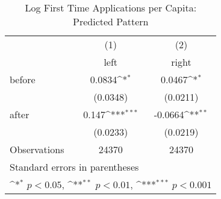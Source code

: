 \begin{table}[htbp]\centering
\def\sym#1{\ifmmode^{#1}\else\(^{#1}\)\fi}
\caption{Log First Time Applications per Capita: Predicted Pattern}
\begin{tabular}{l*{2}{c}}
\hline\hline
                    &\multicolumn{1}{c}{(1)}&\multicolumn{1}{c}{(2)}\\
                    &\multicolumn{1}{c}{left}&\multicolumn{1}{c}{right}\\
\hline
before              &      0.0834\sym{*}  &      0.0467\sym{*}  \\
                    &    (0.0348)         &    (0.0211)         \\
[1em]
after               &       0.147\sym{***}&     -0.0664\sym{**} \\
                    &    (0.0233)         &    (0.0219)         \\
\hline
Observations        &       24370         &       24370         \\
\hline\hline
\multicolumn{3}{l}{\footnotesize Standard errors in parentheses}\\
\multicolumn{3}{l}{\footnotesize \sym{*} \(p<0.05\), \sym{**} \(p<0.01\), \sym{***} \(p<0.001\)}\\
\end{tabular}
\end{table}

